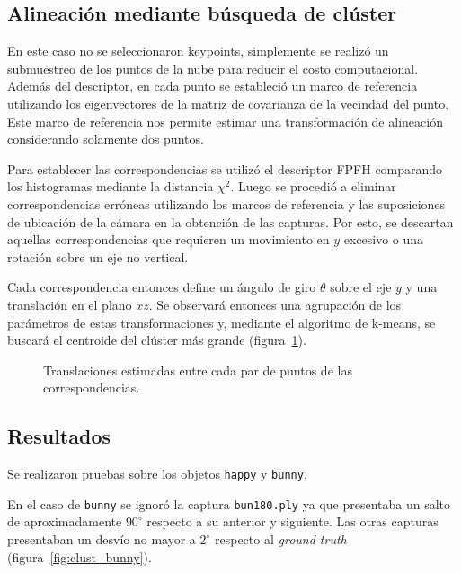 	\subsection{Alineación mediante búsqueda de clúster}
		En este caso no se seleccionaron keypoints, simplemente se realizó un submuestreo de
		los puntos de la nube para reducir el costo computacional.
		Además del descriptor, en cada punto se estableció un marco de referencia utilizando los
		eigenvectores de la matriz de covarianza de la vecindad del punto. Este
		marco de referencia nos permite estimar
		una transformación de alineación considerando solamente dos puntos\cite{ISS}.
		 

		Para establecer las correspondencias se utilizó el descriptor FPFH
		comparando los histogramas mediante la distancia $\chi^2$. 
		Luego se
		procedió a eliminar correspondencias erróneas utilizando los marcos de
		referencia y las suposiciones de ubicación de la cámara en la obtención
		de las capturas.  Por esto, se descartan aquellas correspondencias que
		requieren un movimiento en $y$ excesivo o una rotación sobre un eje no
		vertical. 

		Cada correspondencia entonces define un ángulo de giro $\theta$ sobre
		el eje $y$ y una translación en el plano $xz$.  Se observará entonces
		una agrupación de los parámetros de estas transformaciones y, mediante el
		algoritmo de k-means, se buscará el centroide del clúster más grande (figura~\ref{fig:cluster}).
		\begin{figure}
			\caption{\label{fig:cluster}Translaciones estimadas entre cada par
			de puntos de las correspondencias.} 
		\end{figure}

		\subsection{Resultados}
			Se realizaron pruebas sobre los objetos \texttt{happy} y \texttt{bunny}.

			En el caso de \texttt{bunny} se ignoró la captura
			\texttt{bun180.ply} ya que presentaba un salto de aproximadamente
			$90^{\circ}$ respecto a su anterior y siguiente. 
			Las otras
			capturas presentaban un desvío no mayor a $2^{\circ}$ respecto al
			\emph{ground truth} (figura~\ref{fig:clust_bunny}).

